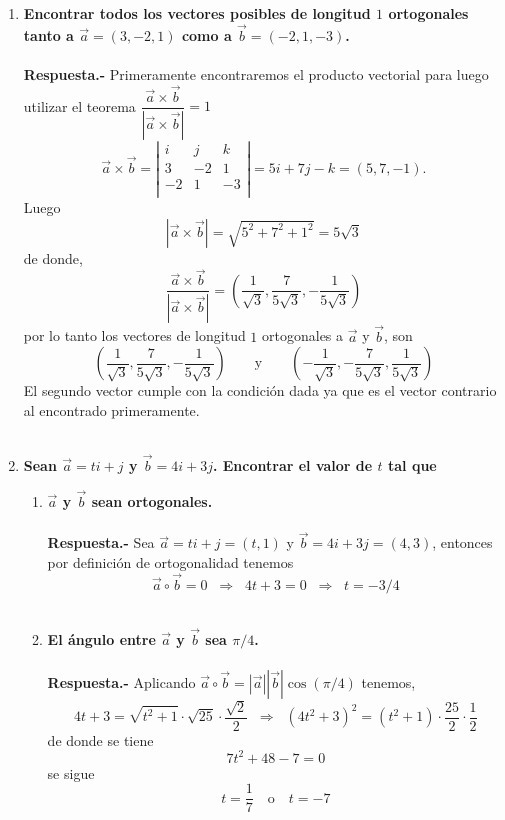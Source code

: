 \begin{enumerate}
\item \textbf{\boldmath Encontrar todos los vectores posibles de longitud $1$ ortogonales tanto a $\vec{a}=(3,-2,1)$ como a $\vec{b}=(-2,1,-3)$.\\\\
    Respuesta.-}\;  Primeramente encontraremos el producto vectorial para luego utilizar el teorema $\dfrac{\vec{a}\times \vec{b}}{|\vec{a}\times \vec{b}|}=1$
    $$\vec{a}\times \vec{b} = \left|\begin{array}{rrr}
	i&j&k\\
	3&-2&1\\
	-2&1&-3\\
    \end{array}\right|=5i+7j-k=(5,7,-1).$$
    Luego $$|\vec{a}\times \vec{b}|=\sqrt{5^2+7^2+1^2}=5\sqrt{3}$$
    de donde, $$\dfrac{\vec{a}\times \vec{b}}{|\vec{a}\times \vec{b}|}=\left(\dfrac{1}{\sqrt{3}},\dfrac{7}{5\sqrt{3}},-\dfrac{1}{5\sqrt{3}}\right)$$
    por lo tanto los vectores de longitud $1$ ortogonales a $\vec{a}$ y $\vec{b}$, son $$\left(\dfrac{1}{\sqrt{3}},\dfrac{7}{5\sqrt{3}},-\dfrac{1}{5\sqrt{3}}\right) \qquad \mbox{y}\qquad \left(-\dfrac{1}{\sqrt{3}},-\dfrac{7}{5\sqrt{3}},\dfrac{1}{5\sqrt{3}}\right)$$
    El segundo vector cumple con la condición dada ya que es el vector contrario al encontrado primeramente.\\\\

\item \textbf{\boldmath Sean $\vec{a}=ti + j$ y $\vec{b}=4i+3j$. Encontrar el valor de $t$ tal que }

\begin{enumerate}[\bfseries a)]
    
    \item \textbf{\boldmath $\vec{a}$ y $\vec{b}$ sean ortogonales.\\\\
	Respuesta.-}\; Sea $\vec{a}=ti + j=(t,1)$ y $\vec{b}=4i+3j=(4,3)$, entonces por definición de ortogonalidad tenemos 
	$$\vec{a}\circ \vec{b} = 0 \;\; \Longrightarrow \; \; 4t+3=0 \;\; \Longrightarrow \; \; t=-3/4$$\\

    \item \textbf{\boldmath El ángulo entre $\vec{a}$ y $\vec{b}$ sea $\pi/4$.\\\\
	Respuesta.-}\; Aplicando $\vec{a}\circ \vec{b}=|\vec{a}||\vec{b}|\cos(\pi/4)$ tenemos, 
	$$4t+3=\sqrt{t^2+1}\cdot \sqrt{25}\cdot \dfrac{\sqrt{2}}{2} \;\; \Longrightarrow \; \; (4t^2+3)^2=(t^2+1)\cdot\dfrac{25}{2}\cdot \dfrac{1}{2}$$
	de donde se tiene $$7t^2+48-7=0$$
	se sigue $$t=\dfrac{1}{7} \quad \mbox{o}\quad t=-7$$\\


\end{enumerate}
\end{enumerate}
